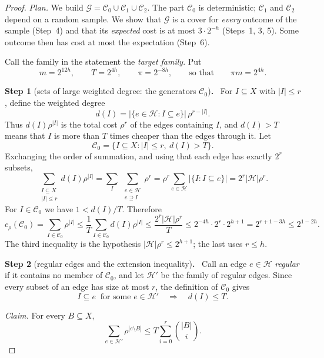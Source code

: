 \documentclass[11pt,letterpaper]{article}
\theoremstyle{definition}
\theoremstyle{remark}
\numberwithin{equation}{section}
\newcommand{\step}[2]{\medskip\noindent\textbf{Step #1} (#2)\textbf{.}\ }
\begin{document}
\begin{proof}
\emph{Plan.} We build $\mathcal G=\mathcal C_0\cup\mathcal C_1\cup\mathcal C_2$.
The part $\mathcal C_0$ is deterministic; $\mathcal C_1$ and $\mathcal C_2$
depend on a random sample. We show that $\mathcal G$ is a cover for
\emph{every} outcome of the sample (Step~4) and that its \emph{expected}
cost is at most $3\cdot2^{-h}$ (Steps~1, 3, 5). Some outcome then has cost
at most the expectation (Step~6).

Call the family in the statement the \emph{target family}. Put
\[
m=2^{12h},\qquad T=2^{4h},\qquad \pi=2^{-8h},
\qquad\text{so that}\qquad \pi m=2^{4h}.
\]

\step{1}{sets of large weighted degree: the generators $\mathcal C_0$}
For \(I\subseteq X\) with \(|I|\le r\), define the weighted degree
\[
d(I)=|\{e\in\mathcal H:I\subseteq e\}|\,\rho^{r-|I|}.
\]
Thus $d(I)\rho^{|I|}$ is the total cost $\rho^r$ of the edges containing
$I$, and $d(I)>T$ means that $I$ is more than $T$ times cheaper than the
edges through it. Let
\[
\mathcal C_0=\{I\subseteq X:|I|\le r,\ d(I)>T\}.
\]
Exchanging the order of summation, and using that each edge has exactly
$2^r$ subsets,
\[
\sum_{\substack{I\subseteq X\\|I|\le r}}d(I)\rho^{|I|}
=\sum_{I}\ \sum_{\substack{e\in\mathcal H\\ e\supseteq I}}\rho^{r}
=\rho^r\sum_{e\in\mathcal H}|\{I:I\subseteq e\}|
=2^r|\mathcal H|\rho^r.
\]
For $I\in\mathcal C_0$ we have $1<d(I)/T$. Therefore
\begin{equation}\label{eq:covering-initial-cost}
c_\rho(\mathcal C_0)=\sum_{I\in\mathcal C_0}\rho^{|I|}
\le\frac1T\sum_{I\in\mathcal C_0}d(I)\rho^{|I|}
\le\frac{2^r|\mathcal H|\rho^r}{T}
\le2^{-4h}\cdot2^r\cdot2^{h+1}=2^{r+1-3h}\le2^{1-2h}.
\end{equation}
The third inequality is the hypothesis $|\mathcal H|\rho^r\le2^{h+1}$;
the last uses $r\le h$.

\step{2}{regular edges and the extension inequality}
Call an edge $e\in\mathcal H$ \emph{regular} if it contains no member of
\(\mathcal C_0\), and let \(\mathcal H'\) be the family of regular edges.
Since every subset of an edge has size at most $r$, the definition of
$\mathcal C_0$ gives
\begin{equation}\label{eq:regular}
I\subseteq e\ \text{ for some }e\in\mathcal H'
\quad\Longrightarrow\quad d(I)\le T.
\end{equation}

\emph{Claim.} For every \(B\subseteq X\),
\begin{equation}\label{eq:covering-extension}
\sum_{e\in\mathcal H'}\rho^{|e\setminus B|}
\le T\sum_{i=0}^r\binom{|B|}{i}.
\end{equation}


\end{proof}
\end{document}
